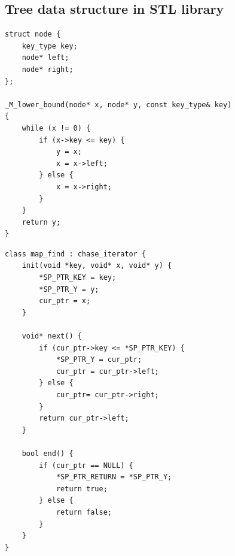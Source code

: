 \begin{minipage}{0.47\textwidth}
\subsection{Tree data structure in STL library}
\centering
\begin{lstlisting}[caption={C++ STL realization for \code{map::find()}},label={lst:map}, captionpos=t]
struct node {
    key_type key;
    node* left;
    node* right;
};

_M_lower_bound(node* x, node* y, const key_type& key)
{
    while (x != 0) {
        if (x->key <= key) {
            y = x; 
            x = x->left;
        } else {
            x = x->right;
        }
    }
    return y;
}
\end{lstlisting}

\begin{lstlisting}[caption={\pulse realization for \code{map::find()}},label={lst:map_mod}, captionpos=t]
class map_find : chase_iterator {
    init(void *key, void* x, void* y) {
        *SP_PTR_KEY = key;
        *SP_PTR_Y = y;
        cur_ptr = x;
    }
  
    void* next() {
        if (cur_ptr->key <= *SP_PTR_KEY) {
            *SP_PTR_Y = cur_ptr;  
            cur_ptr = cur_ptr->left;
        } else {
            cur_ptr= cur_ptr->right;
        }
        return cur_ptr->left;
    }
  
    bool end() {
        if (cur_ptr == NULL) {
            *SP_PTR_RETURN = *SP_PTR_Y;  
            return true;
        } else {
            return false;
        }
    }
}
\end{lstlisting}
\end{minipage}

